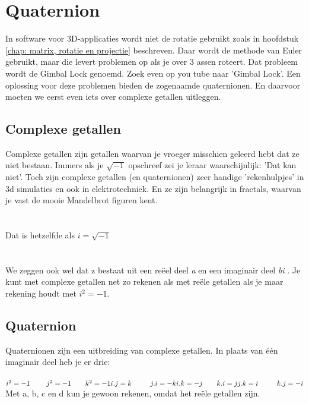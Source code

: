 \chapter{Quaternion}
\label{chap: Quaternion}
In software voor 3D-applicaties wordt niet de rotatie gebruikt zoals in hoofdstuk \ref{chap: matrix, rotatie en projectie} beschreven. Daar wordt de methode van Euler gebruikt, maar die levert problemen op als je over 3 assen roteert. Dat probleem wordt de Gimbal Lock genoemd. Zoek even op you tube naar 'Gimbal Lock'. 
Een oplossing voor deze problemen bieden de zogenaamde quaternionen. En daarvoor moeten we eerst even iets over complexe getallen uitleggen.
\section{Complexe getallen}
Complexe getallen zijn getallen waarvan je vroeger misschien geleerd hebt dat ze niet bestaan. Immers als je $ \sqrt{-1} $ opschreef zei je leraar waarschijnlijk: 'Dat kan niet'. Toch zijn complexe getallen (en quaternionen) zeer handige 'rekenhulpjes' in 3d simulaties en ook in elektrotechniek. En ze zijn belangrijk in fractals, waarvan je vast de mooie Mandelbrot figuren kent. \\ \\
\\
Dat is hetzelfde als $ i =\sqrt{-1} $ \\ \\
\\
We zeggen ook wel dat z bestaat uit een reëel deel \textit{a} en een imaginair deel \textit{bi} .  Je kunt met complexe getallen net zo rekenen als met reële getallen als je maar rekening houdt met $  i^2 = -1.$
\section{Quaternion}
Quaternionen zijn een uitbreiding van complexe getallen. In plaats van één imaginair deel heb je er drie:\\ \\
$ i^2 = -1 \qquad  \ j^2 = -1 \qquad k^2 = -1   \\
i.j = k \qquad \ \ j.i = -k \\
i.k = -j \qquad k.i = j \\
j.k = i \qquad \ \ k.j = -i \\ $
Met a, b, c en d kun je gewoon rekenen, omdat het reële getallen zijn.\\ \\
